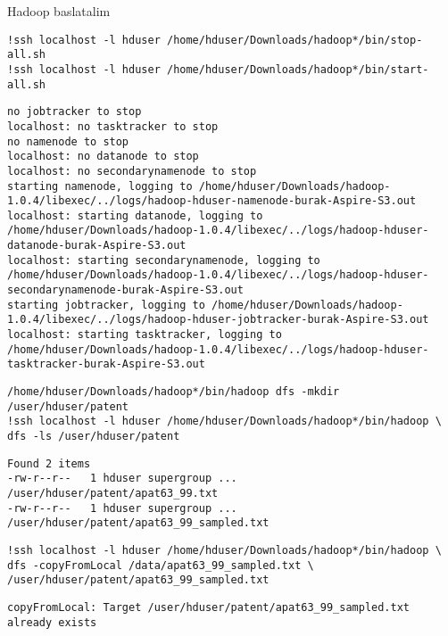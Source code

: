 \documentclass[12pt,fleqn]{article}\usepackage{../common}
\begin{document}
Hadoop baslatalim

\begin{verbatim}
!ssh localhost -l hduser /home/hduser/Downloads/hadoop*/bin/stop-all.sh
!ssh localhost -l hduser /home/hduser/Downloads/hadoop*/bin/start-all.sh
\end{verbatim}

\begin{verbatim}
no jobtracker to stop
localhost: no tasktracker to stop
no namenode to stop
localhost: no datanode to stop
localhost: no secondarynamenode to stop
starting namenode, logging to /home/hduser/Downloads/hadoop-1.0.4/libexec/../logs/hadoop-hduser-namenode-burak-Aspire-S3.out
localhost: starting datanode, logging to /home/hduser/Downloads/hadoop-1.0.4/libexec/../logs/hadoop-hduser-datanode-burak-Aspire-S3.out
localhost: starting secondarynamenode, logging to /home/hduser/Downloads/hadoop-1.0.4/libexec/../logs/hadoop-hduser-secondarynamenode-burak-Aspire-S3.out
starting jobtracker, logging to /home/hduser/Downloads/hadoop-1.0.4/libexec/../logs/hadoop-hduser-jobtracker-burak-Aspire-S3.out
localhost: starting tasktracker, logging to /home/hduser/Downloads/hadoop-1.0.4/libexec/../logs/hadoop-hduser-tasktracker-burak-Aspire-S3.out
\end{verbatim}

\begin{verbatim}
/home/hduser/Downloads/hadoop*/bin/hadoop dfs -mkdir /user/hduser/patent
!ssh localhost -l hduser /home/hduser/Downloads/hadoop*/bin/hadoop \
dfs -ls /user/hduser/patent
\end{verbatim}

\begin{verbatim}
Found 2 items
-rw-r--r--   1 hduser supergroup ...  /user/hduser/patent/apat63_99.txt
-rw-r--r--   1 hduser supergroup ...   /user/hduser/patent/apat63_99_sampled.txt
\end{verbatim}

\begin{verbatim}
!ssh localhost -l hduser /home/hduser/Downloads/hadoop*/bin/hadoop \
dfs -copyFromLocal /data/apat63_99_sampled.txt \
/user/hduser/patent/apat63_99_sampled.txt
\end{verbatim}

\begin{verbatim}
copyFromLocal: Target /user/hduser/patent/apat63_99_sampled.txt already exists
\end{verbatim}
\end{document}
